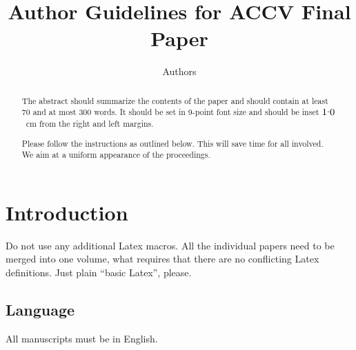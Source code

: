\documentclass[runningheads]{llncs}
\begin{document}
\newcommand{\point}{
    \raise0.7ex\hbox{.}
    }


\pagestyle{headings}

\mainmatter

\title{Author Guidelines for ACCV Final Paper} %



\author{Authors} %

\maketitle

\begin{abstract}
The abstract should summarize the contents of the paper and should
contain at least 70 and at most 300 words. It should be set in 9-point
font size and should be inset $1\point0$~cm from the right and left margins.

Please follow the instructions as outlined below. This will save time for all involved.
We aim at a uniform appearance of the proceedings.
\end{abstract}

\section{Introduction}

Do not use any additional Latex macros. All the individual papers need to be
merged into one volume, what requires that there are no conflicting Latex definitions.
Just plain ``basic Latex'', please.

\subsection{Language}

All manuscripts must be in English.
\end{document}

